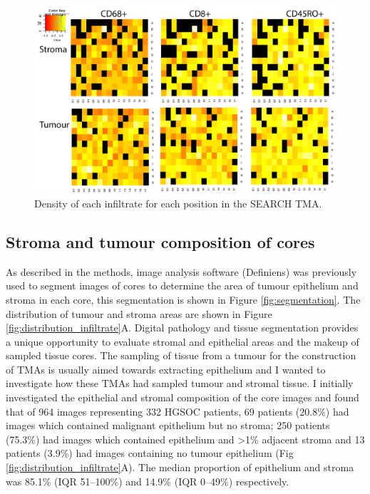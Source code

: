 \begin{figure}
    \centering
    \includegraphics{Chapter2/Figs/Raster/Thesis-heatmap.png}
    \caption{Density of each infiltrate for each position in the SEARCH TMA.}
    \label{fig:outlying_core}
\end{figure}


\subsection{Stroma and tumour composition of cores}
As described in the methods, image analysis software (Definiens) was previously used to segment images of cores to determine the area of tumour epithelium and stroma in each core, this segmentation is shown in Figure \ref{fig:segmentation}. The distribution of tumour and stroma areas are shown in Figure \ref{fig:distribution_infiltrate}A. Digital pathology and tissue segmentation provides a unique opportunity to evaluate stromal and epithelial areas and the makeup of sampled tissue cores. The sampling of tissue from a tumour for the construction of TMAs is usually aimed towards extracting epithelium and I wanted to investigate how these TMAs had sampled tumour and stromal tissue. I initially investigated the epithelial and stromal composition of the core images and found that of 964 images representing 332 HGSOC patients, 69 patients (20.8\%) had images which contained malignant epithelium but no stroma; 250 patients (75.3\%) had images which contained epithelium and >1\% adjacent stroma and 13 patients (3.9\%) had images containing no tumour epithelium (Fig \ref{fig:distribution_infiltrate}A). The median proportion of epithelium and stroma was 85.1\% (IQR 51–100\%) and 14.9\% (IQR 0–49\%) respectively.



